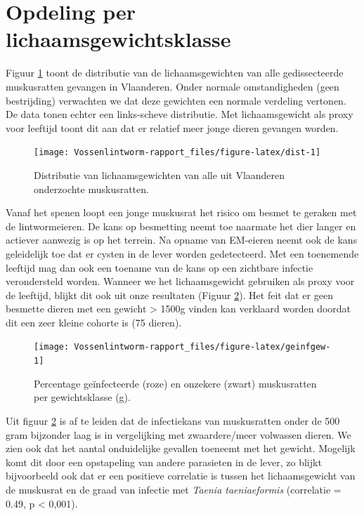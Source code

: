 \documentclass[twoside]{extreport}
\begin{document}
\section{Opdeling per
lichaamsgewichtsklasse}\label{opdeling-per-lichaamsgewichtsklasse}

Figuur \ref{fig:dist} toont de distributie van de lichaamsgewichten van
alle gedissecteerde muskusratten gevangen in Vlaanderen. Onder normale
omstandigheden (geen bestrijding) verwachten we dat deze gewichten een
normale verdeling vertonen. De data tonen echter een links-scheve
distributie. Met lichaamsgewicht als proxy voor leeftijd toont dit aan
dat er relatief meer jonge dieren gevangen worden.

\begin{figure}

{\centering \texttt{[image: Vossenlintworm-rapport\_files/figure-latex/dist-1]} 

}

\caption{Distributie van lichaamsgewichten van alle uit Vlaanderen onderzochte muskusratten.}\label{fig:dist}
\end{figure}

Vanaf het spenen loopt een jonge muskusrat het risico om besmet te
geraken met de lintwormeieren. De kans op besmetting neemt toe naarmate
het dier langer en actiever aanwezig is op het terrein. Na opname van
EM-eieren neemt ook de kans geleidelijk toe dat er cysten in de lever
worden gedetecteerd. Met een toenemende leeftijd mag dan ook een toename
van de kans op een zichtbare infectie verondersteld worden. Wanneer we
het lichaamsgewicht gebruiken als proxy voor de leeftijd, blijkt dit ook
uit onze resultaten (Figuur \ref{fig:geinfgew}). Het feit dat er geen
besmette dieren met een gewicht \textgreater{} 1500g vinden kan
verklaard worden doordat dit een zeer kleine cohorte is (75 dieren).

\begin{figure}

{\centering \texttt{[image: Vossenlintworm-rapport\_files/figure-latex/geinfgew-1]} 

}

\caption{Percentage geïnfecteerde (roze) en onzekere (zwart) muskusratten per gewichtsklasse (g).}\label{fig:geinfgew}
\end{figure}

Uit figuur \ref{fig:geinfgew} is af te leiden dat de infectiekans van
muskusratten onder de 500 gram bijzonder laag is in vergelijking met
zwaardere/meer volwassen dieren. We zien ook dat het aantal onduidelijke
gevallen toeneemt met het gewicht. Mogelijk komt dit door een
opstapeling van andere parasieten in de lever, zo blijkt bijvoorbeeld
ook dat er een positieve correlatie is tussen het lichaamsgewicht van de
muskusrat en de graad van infectie met \emph{Taenia taeniaeformis}
(correlatie = 0.49, p \textless{} 0,001).
\end{document}
